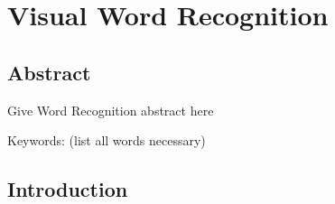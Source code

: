 
\chapter{Visual Word Recognition} %

\label{Chapter4} %

\section{Abstract}

Give Word Recognition abstract here

Keywords: (list all words necessary)


\section{Introduction}


